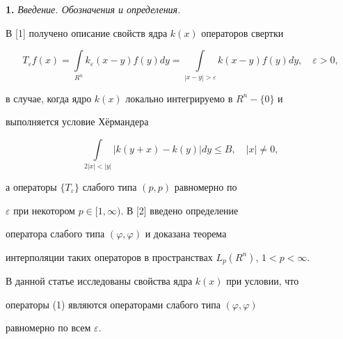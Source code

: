 \pagestyle{plain} %


 




\maketitle 


\label{begin} 


 


 


{\bf 1.} {\it Введение. Обозначения и определения.} 


В [1] получено описание свойств ядра $k(x)$ операторов свертки 


\begin{equation} 


T_\varepsilon f(x)=\int\limits_{R^n}k_\varepsilon 


(x-y)f(y)d y=\int\limits_{|x-y|>\varepsilon} 


k(x-y)f(y)d y,\quad \varepsilon>0, 


\end{equation} 


в случае, когда ядро $k(x)$ локально интегрируемо в $R^n-\{0\}$ и 


выполняется условие Х\"ермандера 


\begin{equation} 


\int\limits_{2|x|<|y|}|k(y+x)-k(y)|d y\le B,\quad |x|\ne0, 


\end{equation} 


а операторы $\{T_\varepsilon\}$ слабого типа $(p,p)$ равномерно по 


$\varepsilon$ при некотором $p\in[1,\infty)$. В [2] введено определение 


оператора слабого типа $(\varphi,\varphi)$ и доказана теорема 


интерполяции таких операторов в пространствах $L_p(R^n)$, $1<p<\infty$. 


В данной статье исследованы свойства ядра $k(x)$ при условии, что 


операторы (1) являются операторами слабого типа $(\varphi,\varphi)$ 


равномерно по всем $\varepsilon$. 


 


